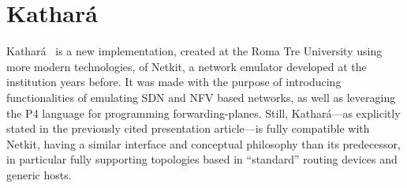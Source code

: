 
\chapter{Kathará}
\label{ch:kathara}

Kathará~\cite{kathara} is a new implementation, created at the Roma Tre University using more modern technologies, of Netkit, a network emulator developed at the institution years before.
It was made with the purpose of introducing functionalities of emulating SDN and NFV based networks, as well as leveraging the P4 language for programming forwarding-planes.
Still, Kathará---as explicitly stated in the previously cited presentation article---is fully compatible with Netkit, having a similar interface and conceptual philosophy than its predecessor, in particular fully supporting topologies based in ``standard'' routing devices and generic hosts.









